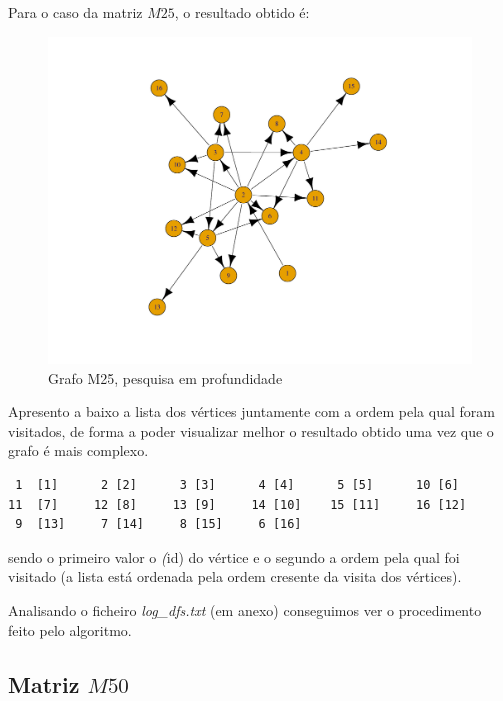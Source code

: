 \documentclass[a4paper,12pt]{report}
\begin{document}
Para o caso da matriz $M25$, o resultado obtido é:
\begin{figure}[H]
    \centering
        \includegraphics[scale=0.25]{img/dfsM25.pdf}
    \caption{Grafo M25, pesquisa em profundidade}
    \label{fig:dfsP}
\end{figure}

Apresento a baixo a lista dos vértices juntamente com a ordem pela qual foram visitados, de forma a poder visualizar melhor o resultado obtido uma vez que o grafo é mais complexo.

\begin{lstlisting}
 1  [1]      2 [2]      3 [3]      4 [4]      5 [5]      10 [6]
11  [7]     12 [8]     13 [9]     14 [10]    15 [11]     16 [12]
 9  [13]     7 [14]     8 [15]     6 [16]
\end{lstlisting}

sendo o primeiro valor o \textit(id) do vértice e o segundo a ordem pela qual foi visitado (a lista está ordenada pela ordem cresente da visita dos vértices).

Analisando o ficheiro \textit{log\_dfs.txt} (em anexo) conseguimos ver o procedimento feito pelo algoritmo.

\subsection*{Matriz $M50$}
\end{document}
